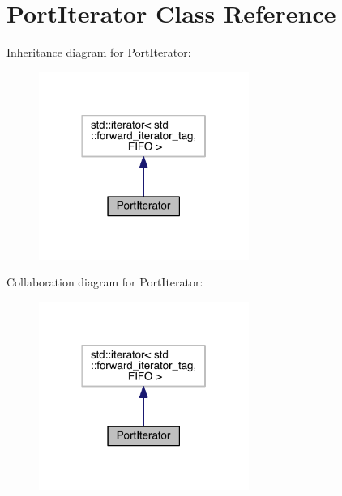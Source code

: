 \hypertarget{class_port_iterator}{}\section{Port\+Iterator Class Reference}
\label{class_port_iterator}


Inheritance diagram for Port\+Iterator\+:
\nopagebreak
\begin{figure}[H]
\begin{center}
\leavevmode
\includegraphics[width=194pt]{class_port_iterator__inherit__graph}
\end{center}
\end{figure}


Collaboration diagram for Port\+Iterator\+:
\nopagebreak
\begin{figure}[H]
\begin{center}
\leavevmode
\includegraphics[width=194pt]{class_port_iterator__coll__graph}
\end{center}
\end{figure}
